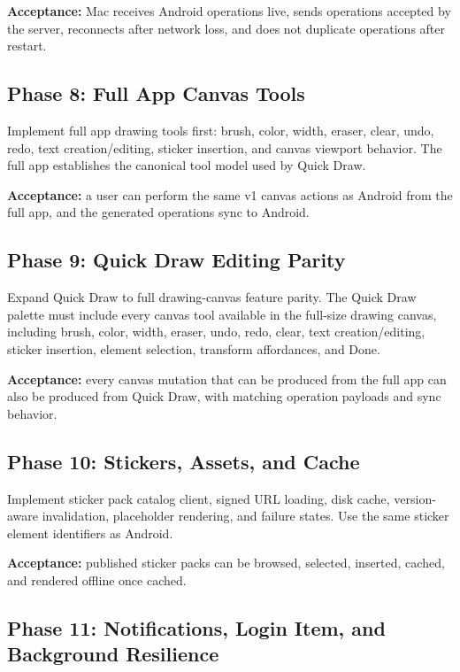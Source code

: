 \documentclass[11pt]{article}
\begin{document}
\textbf{Acceptance:} Mac receives Android operations live, sends operations accepted by the server, reconnects after network loss, and does not duplicate operations after restart.

\subsection{Phase 8: Full App Canvas Tools}

Implement full app drawing tools first: brush, color, width, eraser, clear, undo, redo, text creation/editing, sticker insertion, and canvas viewport behavior. The full app establishes the canonical tool model used by Quick Draw.

\textbf{Acceptance:} a user can perform the same v1 canvas actions as Android from the full app, and the generated operations sync to Android.

\subsection{Phase 9: Quick Draw Editing Parity}

Expand Quick Draw to full drawing-canvas feature parity. The Quick Draw palette must include every canvas tool available in the full-size drawing canvas, including brush, color, width, eraser, undo, redo, clear, text creation/editing, sticker insertion, element selection, transform affordances, and Done.

\textbf{Acceptance:} every canvas mutation that can be produced from the full app can also be produced from Quick Draw, with matching operation payloads and sync behavior.

\subsection{Phase 10: Stickers, Assets, and Cache}

Implement sticker pack catalog client, signed URL loading, disk cache, version-aware invalidation, placeholder rendering, and failure states. Use the same sticker element identifiers as Android.

\textbf{Acceptance:} published sticker packs can be browsed, selected, inserted, cached, and rendered offline once cached.

\subsection{Phase 11: Notifications, Login Item, and Background Resilience}
\end{document}
